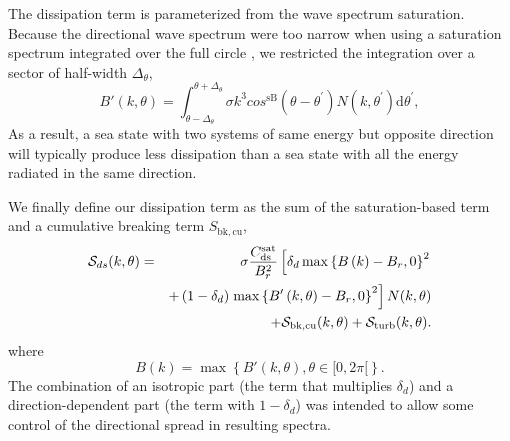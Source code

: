 The dissipation term is parameterized from the wave spectrum
saturation. Because the directional wave spectrum were too narrow when using a
saturation spectrum integrated over the full circle \citep{art:AL06}, we
restricted the integration over a sector of half-width $\Delta_\theta$,
\begin{equation}
B'\left(k,\theta\right)=
\int_{\theta-\Delta_\theta}^{\theta+\Delta_\theta} \sigma k^3 cos^{\mathrm{sB}}\left(\theta-
\theta^{\prime}\right) N(k,\theta^{\prime}) \mathrm d
\theta^{\prime} \label{defBofkprime},
\end{equation}
As a result, a sea state with two systems of same energy but opposite
direction will typically produce less dissipation than a sea state with all
the energy radiated in the same direction.

We finally define our dissipation term as the sum of the saturation-based term
and a cumulative breaking term $S_{\mathrm{bk,cu}}$,
\begin{eqnarray}
{\cal S}_{ds}(k,\theta)& =&  \sigma
 \frac{C_{\mathrm{ds}}^{\mathrm{sat}}}{B^2_r} \left[ \delta_d
\max\left\{ B\left(k\right) -
B_r,0\right\}^2 \right.
\nonumber \\
  & & +  \left(1-\delta_d \right) \left. \max\left\{B'\left(k,\theta \right)- B_r
 ,0\right\}^2\right]N(k,\theta)  \nonumber \\
 & & + {\cal S}_{\mathrm{bk,cu}}(k,\theta) + {\cal S}_{\mathrm{turb}}(k,\theta) \label{Sds_all}.
\end{eqnarray}
where
\begin{equation}
B\left(k \right)=\max\left\{B'(k,\theta), \theta \in [0,2
\pi[\right\} \label{defBof}.
\end{equation}
The combination of an isotropic part (the term that multiplies $ \delta_d$)
and a direction-dependent part (the term with $1-\delta_d$) was intended to
allow some control of the directional spread in resulting spectra.

